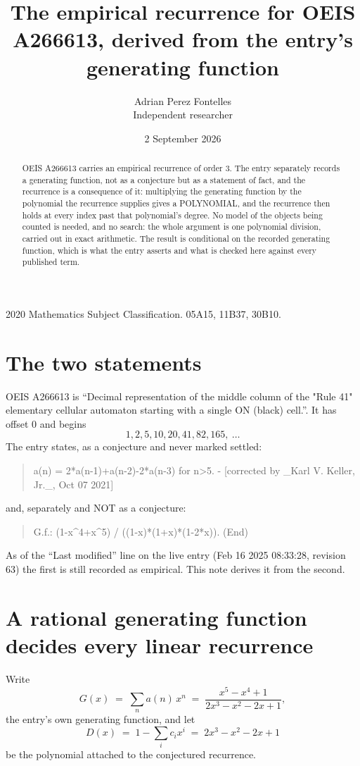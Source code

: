 \documentclass[11pt,a4paper]{article}
\title{The empirical recurrence for OEIS A266613, derived from the entry's generating function}
\author{Adrian Perez Fontelles\\ \small Independent researcher}
\date{2 September 2026}
\theoremstyle{plain}
\theoremstyle{definition}
\begin{document}
\maketitle

\begin{abstract}
OEIS A266613 carries an empirical recurrence of order $3$. The entry separately records a
generating function, not as a conjecture but as a statement of fact, and the recurrence is a
consequence of it: multiplying the generating function by the polynomial the recurrence
supplies gives a POLYNOMIAL, and the recurrence then holds at every index past that
polynomial's degree. No model of the objects being counted is needed, and no search: the
whole argument is one polynomial division, carried out in exact arithmetic. The result is
conditional on the recorded generating function, which is what the entry asserts and what is
checked here against every published term.
\end{abstract}

\noindent\small 2020 Mathematics Subject Classification. 05A15, 11B37, 30B10.\normalsize

\section{The two statements}

OEIS A266613 is ``Decimal representation of the middle column of the "Rule 41" elementary cellular automaton starting with a single ON (black) cell.''. It has offset $0$ and begins
\[
1, 2, 5, 10, 20, 41, 82, 165,\ \dots
\]
The entry states, as a conjecture and never marked settled:
\begin{quote}
a(n) = 2*a(n-1)+a(n-2)-2*a(n-3) for n>5. - [corrected by \_Karl V. Keller, Jr.\_, Oct 07 2021]
\end{quote}
and, separately and NOT as a conjecture:
\begin{quote}
G.f.: (1-x\^{}4+x\^{}5) / ((1-x)*(1+x)*(1-2*x)). (End)
\end{quote}
As of the ``Last modified'' line on the live entry (Feb 16 2025 08:33:28, revision 63) the first is still
recorded as empirical. This note derives it from the second.

\section{A rational generating function decides every linear recurrence}

Write
\[
G(x)\;=\;\sum_{n}a(n)\,x^{n}\;=\;\frac{x^{5} - x^{4} + 1}{2 x^{3} - x^{2} - 2 x + 1},
\]
the entry's own generating function, and let
\[
D(x)\;=\;1-\sum_i c_i x^{i}\;=\;2 x^{3} - x^{2} - 2 x + 1
\]
be the polynomial attached to the conjectured recurrence.
\end{document}
